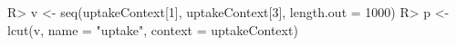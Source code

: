 \begin{Schunk}
% --begin: "pbld5"
\begin{Sinput}
R> v <- seq(uptakeContext[1], uptakeContext[3], length.out = 1000)
R> p <- lcut(v, name = "uptake", context = uptakeContext)
\end{Sinput}
%
% --end: "pbld5"
\end{Schunk}
